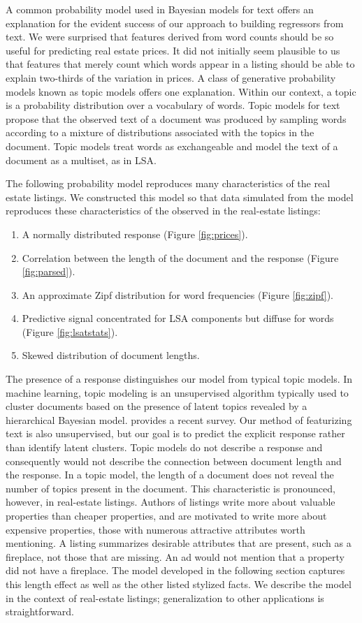 \documentclass[12pt]{article}
\begin{document}
A common probability model used in Bayesian models for text offers an explanation for  the evident success of our approach to building regressors from text.  We were surprised that features derived from word counts should be so useful for predicting real estate prices.  It did not initially seem plausible to us that features that merely count which words appear in a listing should be able to explain two-thirds of the variation in prices.  A class of generative probability models known as topic models offers one explanation.  Within our context, a topic is a probability distribution over a vocabulary of words.  Topic models for text propose that the observed text of a document was produced by sampling words according to a mixture of distributions associated with the topics in the document. Topic models treat words as exchangeable and model the text of a document as a multiset,  as in LSA.     


The following probability model reproduces many characteristics of the real estate listings.   We constructed this model so that data simulated from the model  reproduces these characteristics of the observed in the real-estate listings:
\begin{enumerate}
 \item  A normally distributed response (Figure \ref{fig:prices}).
  \item Correlation between the length of the document and the response
  (Figure \ref{fig:parsed}).
 \item An approximate Zipf distribution for word frequencies (Figure \ref{fig:zipf}).
  \item Predictive signal concentrated for LSA components but diffuse for words (Figure \ref{fig:lsatstats}).
  \item Skewed distribution of document lengths.
\end{enumerate}


The presence of a response distinguishes our model from typical topic models.  In machine learning, topic modeling is an unsupervised algorithm typically used to cluster documents based on the presence of latent topics revealed by a hierarchical Bayesian  model.  \citet{blei12} provides a recent survey.  Our method of featurizing text is also unsupervised,  but our goal is to predict the explicit response rather than identify latent clusters. Topic models do not describe a response and consequently would not describe the connection between document length and the response.  In a topic model, the length of a document does not reveal the number of topics  present in the document.  This characteristic is pronounced, however,  in real-estate listings.  Authors of listings write more about valuable properties than cheaper properties, and are motivated to write more about expensive properties, those with numerous attractive attributes worth mentioning.  A listing summarizes desirable attributes that are present, such as a fireplace, not those that are missing.   An ad would not mention that a property did not have a fireplace.  The  model developed in the following section captures this length effect as well as the other listed stylized facts.  We describe the model in the context of real-estate listings; generalization to other applications is straightforward.
\end{document}
